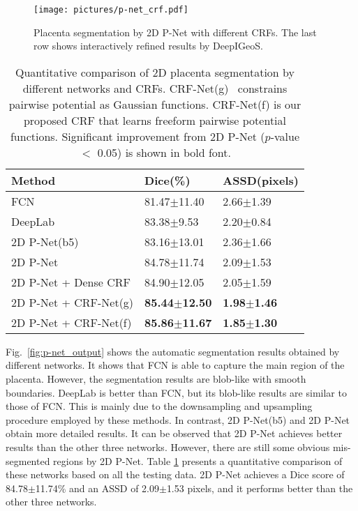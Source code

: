 \documentclass[10pt,journal,compsoc]{IEEEtran}
\begin{document}
\begin{figure}[t]
	\centering
	\texttt{[image: pictures/p-net\_crf.pdf]}
	\caption[Visual comparison of placenta segmentation by 2D P-Net with different CRFs.]{ 
		Placenta segmentation by 2D P-Net with different CRFs. The last row shows interactively refined results by DeepIGeoS.
		} 
	\label{fig:p-net_crf}
\end{figure}

\begin{table}
	\centering
	\small
	\caption{Quantitative comparison of 2D placenta segmentation by different networks and CRFs. CRF-Net(g)~\cite{Zheng2015a} constrains pairwise potential as Gaussian functions. CRF-Net(f) is our proposed CRF that learns freeform pairwise potential functions. Significant improvement from 2D P-Net ($p$-value $<$ 0.05) is shown in bold font.}
	\label{lab:p-net_dice}
	\begin{tabular}{lll}
		
		\hline
		Method & Dice(\%) & ASSD(pixels) \\ \hline
		FCN~\cite{Long2014}       & 81.47$\pm$11.40 & 2.66$\pm$1.39 \\ 
		DeepLab~\cite{Chen2016deeplab}   & 83.38$\pm$9.53  & 2.20$\pm$0.84 \\
		2D P-Net(b5) & 83.16$\pm$13.01 & 2.36$\pm$1.66 \\
		2D P-Net     & 84.78$\pm$11.74 & 2.09$\pm$1.53 \\  
		2D P-Net + Dense CRF & 84.90$\pm$12.05          & 2.05$\pm$1.59 \\ 
		2D P-Net + CRF-Net(g)       & \textbf{85.44$\pm$12.50} & \textbf{1.98$\pm$1.46} \\ 
		2D P-Net + CRF-Net(f)       & \textbf{85.86$\pm$11.67} & \textbf{1.85$\pm$1.30} \\ \hline
	\end{tabular}
\end{table}
	
Fig.~\ref{fig:p-net_output} shows the automatic segmentation results obtained by different networks. It shows that FCN is able to capture the main region of the placenta. However, the segmentation results are blob-like with smooth boundaries. %
DeepLab is better than FCN, but its blob-like results are similar to those of FCN. This is mainly due to the downsampling and upsampling procedure employed by these methods. In contrast, 2D P-Net(b5) and 2D P-Net obtain more detailed results. %
It can be observed that 2D P-Net achieves better results than the other three networks. However, there are still some obvious mis-segmented regions by 2D P-Net. %
Table \ref{lab:p-net_dice} presents a quantitative comparison of these networks based on all the testing data. 2D P-Net achieves a Dice score of 84.78$\pm$11.74\% and an ASSD of 2.09$\pm$1.53 pixels, and it performs better than the other three networks. %
\end{document}
